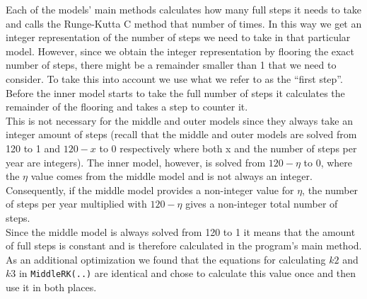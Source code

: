 Each of the models' main methods calculates how many full steps it needs to take and calls the Runge-Kutta C method that number of times. In this way we get an integer representation of the number of steps we need to take in that particular model. However, since we obtain the integer representation by flooring the exact number of steps, there might be a remainder smaller than 1 that we need to consider. To take this into account we use what we refer to as the ``first step''. Before the inner model starts to take the full number of steps it calculates the remainder of the flooring and takes a step to counter it. \\

This is not necessary for the middle and outer models since they always take an integer amount of steps (recall that the middle and outer models are solved from 120 to 1 and $120-x$ to 0 respectively where both x and the number of steps per year are integers). The inner model, however, is solved from $120-\eta$ to 0, where the $\eta$ value comes from the middle model and is not always an integer. Consequently, if the middle model provides a non-integer value for $\eta$, the number of steps per year multiplied with $120-\eta$ gives a non-integer total number of steps. \\

Since the middle model is always solved from 120 to 1 it means that the amount of full steps is constant and is therefore calculated in the program's main method. \\

As an additional optimization we found that the equations for calculating $k2$ and $k3$ in \texttt{MiddleRK(..)} are identical and chose to calculate this value once and then use it in both places.
